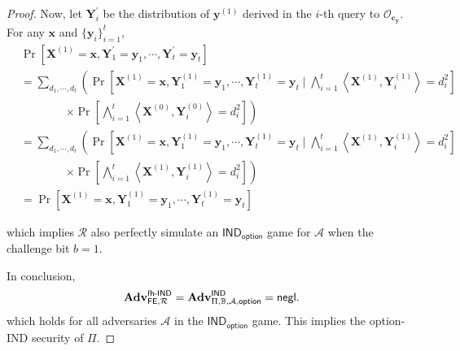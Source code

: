 \begin{proof}
Now, let $\mathbf{Y}^\prime_i$ be the distribution of $\mathbf{y}^{(1)}$ derived in the $i$-th query to $\mathcal{O}_{\mathbf{c_y}}$. For any $\mathbf{x}$ and $\{ \mathbf{y}_i \}_{i=1}^t$,
\begin{align*}
	& \Pr [\mathbf{X}^{(1)} = \mathbf{x}, \mathbf{Y}^\prime_1 = \mathbf{y}_1, \cdots, \mathbf{Y}^\prime_t = \mathbf{y}_t] \\
	&= \sum_{d_1, \cdots, d_t} \left( \Pr \left[\mathbf{X}^{(1)} = \mathbf{x}, \mathbf{Y}^{(1)}_1 = \mathbf{y}_1, \cdots, \mathbf{Y}^{(1)}_t = \mathbf{y}_t \mid \bigwedge_{i=1}^t \left\langle \mathbf{X}^{(1)}, {\mathbf{Y}^{(1)}_i} \right\rangle = d_i^2 \right] \right. \\
	&\qquad \qquad \left. \times \Pr \left[\bigwedge_{i=1}^t \left\langle \mathbf{X}^{(0)}, {\mathbf{Y}_i^{(0)}} \right\rangle = d_i^2 \right] \right) \\
	&= \sum_{d_1, \cdots, d_t} \left( \Pr \left[\mathbf{X}^{(1)} = \mathbf{x}, \mathbf{Y}^{(1)}_1 = \mathbf{y}_1, \cdots, \mathbf{Y}^{(1)}_t = \mathbf{y}_t \mid \bigwedge_{i=1}^t \left\langle \mathbf{X}^{(1)}, {\mathbf{Y}^{(1)}_i} \right\rangle = d_i^2 \right] \right. \\
	&\qquad \qquad \left. \times \Pr \left[\bigwedge_{i=1}^t \left\langle \mathbf{X}^{(1)}, {\mathbf{Y}_i^{(1)}} \right\rangle = d_i^2 \right] \right) \\
	&= \Pr[\mathbf{X}^{(1)} = \mathbf{x}, \mathbf{Y}^{(1)}_1 = \mathbf{y}_1, \cdots, \mathbf{Y}^{(1)}_t = \mathbf{y}_t ]
\end{align*}

\noindent which implies $\mathcal{R}$ also perfectly simulate an $\textsf{IND}_{\textsf{option}}$ game for $\mathcal{A}$ when the challenge bit $b = 1$.

In conclusion, 
\[
	\mathbf{Adv}_{\textsf{FE}, \mathcal{R}}^\textsf{fh-IND} = \mathbf{Adv}_{\Pi, \mathbb{B}, \mathcal{A}, \textsf{option}}^\textsf{IND} = \mathsf{negl}.
\]
which holds for all adversaries $\mathcal{A}$ in the $\textsf{IND}_{\textsf{option}}$ game. This implies the \textsf{option}-IND security of $\Pi$.


\end{proof}

